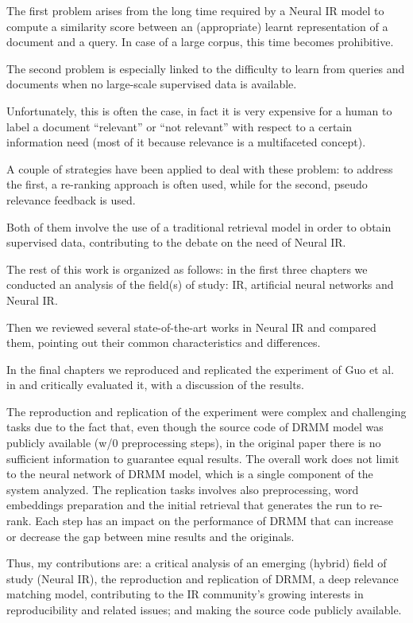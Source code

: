 The first problem arises from the long time required by a Neural IR model to compute a similarity score between an (appropriate) learnt representation of a document and a query. In case of a large corpus, this time becomes prohibitive.

The second problem is especially linked to the difficulty to learn from queries and documents when no large-scale supervised data is available.

Unfortunately, this is often the case, in fact it is very expensive for a human to label a document ``relevant'' or ``not relevant'' with respect to a certain information need (most of it because relevance is a multifaceted concept).

A couple of strategies have been applied to deal with these problem: to address the first, a re-ranking approach is often used, while for the second, pseudo relevance feedback is used.

Both of them involve the use of a traditional retrieval model in order to obtain supervised data, contributing to the debate on the need of Neural IR.

The rest of this work is organized as follows: in the first three chapters we conducted an analysis of the field(s) of study: IR, artificial neural networks and Neural IR.

Then we reviewed several state-of-the-art works in Neural IR and compared them, pointing out their common characteristics and differences.

In the final chapters we reproduced and replicated the experiment of Guo et al. in \cite{drmm} and critically evaluated it, with a discussion of the results.

The reproduction and replication of the experiment were complex and challenging tasks due to the fact that, even though the source code of DRMM model was publicly available (w/0 preprocessing steps), in the original paper there is no sufficient information to guarantee equal results. The overall work does not limit to the neural network of DRMM model, which is a single component of the system analyzed. The replication tasks involves also preprocessing, word embeddings preparation and the initial retrieval that generates the run to re-rank. Each step has an impact on the performance of DRMM that can increase or decrease the gap between mine results and the originals.

Thus, my contributions are: a critical analysis of an emerging (hybrid) field of study (Neural IR), the reproduction and replication of DRMM, a deep relevance matching model, contributing to the IR community's growing interests in reproducibility and related issues; and making the source code publicly available.

